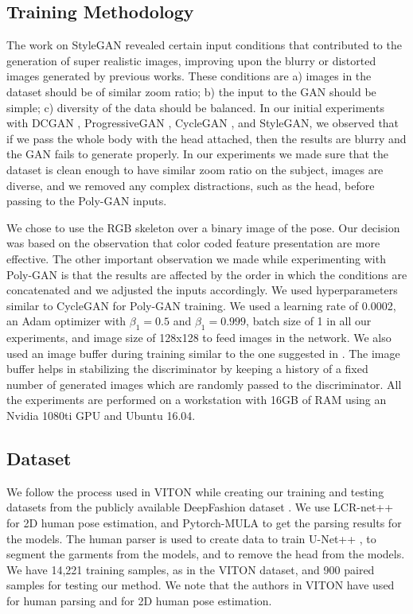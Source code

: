 \documentclass[11pt]{article}
\begin{document}
\subsection{Training Methodology}
The work on StyleGAN \citet{StyleGAN} revealed certain input conditions that contributed to the generation of super realistic images, improving upon the blurry or distorted images generated by previous works. These conditions are a) images in the dataset should be of similar zoom ratio; b) the input to the GAN should be simple; c) diversity of the data should be balanced.
In our initial experiments with DCGAN \citet{DCGAN}, ProgressiveGAN \citet{PGAN}, CycleGAN \citet{CycleGAN}, and StyleGAN, we observed that if we pass the whole body with the head attached, then the results are blurry and the GAN fails to generate properly. In our experiments we made sure that the dataset is clean enough to have similar zoom ratio on the subject, images are diverse, and we removed any complex distractions, such as the head, before passing to the Poly-GAN inputs.


We chose to use the RGB skeleton over a binary image of the pose. Our decision was based on the observation that color coded feature presentation are more effective. The other important observation we made while experimenting with Poly-GAN is that the results are affected by the order in which the conditions are concatenated and we adjusted the inputs accordingly. We used hyperparameters similar to CycleGAN \citet{CycleGAN} for Poly-GAN training. We used a learning rate of 0.0002, an Adam optimizer with $\beta_{1}=0.5$ and $\beta_{1}=0.999$, batch size of 1 in all our experiments, and image size of 128x128 to feed images in the network. We also used an image buffer during training similar to the one suggested in \citet{Shrivastava}. The image buffer helps in stabilizing the discriminator by keeping a history of a fixed number of generated images which are randomly passed to the discriminator. All the experiments are performed on a workstation with 16GB of RAM using an Nvidia 1080ti GPU and Ubuntu 16.04.


\subsection{Dataset}

We follow the process used in VITON \citet{VITON} while creating our training and testing datasets from the publicly available DeepFashion dataset \citet{DeepFashion}. 
We use LCR-net++ \citet{LCR} for 2D human pose estimation, and Pytorch-MULA \citet{MULA} \citet{Pytorch-MULA} to get the parsing results for the models. The human parser \citet{MULA} is used to create data to train U-Net++ \citet{Unet++}, to segment the garments from the models, and to remove the head from the models.
We have 14,221 training samples, as in the VITON dataset, and 900 paired samples for testing our method.
We note that the authors in VITON \citet{VITON} have used \citet{SSL} for human parsing and \citet{RPose} for 2D human pose estimation. 
\end{document}
